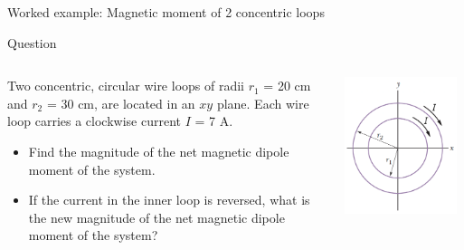 %
%

{
\problemslide

%
%
%

\begin{frame}{Worked example: Magnetic moment of 2 concentric loops}

  \begin{blockexmplque}{Question}
    \begin{columns}
      \begin{column}{0.65\textwidth}
          Two concentric, circular wire loops of radii $r_1$ = 20 cm and $r_2$ = 30 cm,
          are located in an $xy$ plane. Each wire loop carries a clockwise current $I$ = 7 A.
          \begin{itemize}
           \item  Find the magnitude of the net magnetic dipole moment of the system.
           \item If the current in the inner loop is reversed, what is the new
           magnitude of the net magnetic dipole moment of the system?
          \end{itemize}
      \end{column}
      \begin{column}{0.35\textwidth}
        \begin{center}
            \includegraphics[width=0.95\textwidth]{./images/problems/lect06_2_concentric_wire_loops.png}
        \end{center}
      \end{column}
    \end{columns}
  \end{blockexmplque}


\end{frame}}
